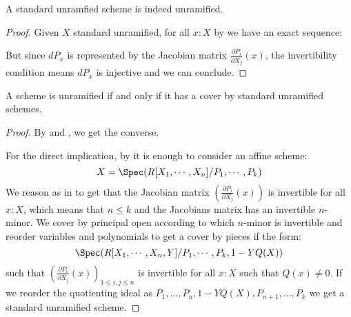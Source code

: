 
\begin{lemma}\label{standard-unramified-is-unramified}
A standard unramfied scheme is indeed unramified.
\end{lemma}

\begin{proof}
Given $X$ standard unramified, for all $x:X$ by  we have an exact sequence:
  \begin{center}
  \end{center}
  But since $dP_x$ is represented by the Jacobian matrix $\frac{\partial P_i}{\partial X_j}(x)$, the invertibility condition means $dP_x$ is injective and we can conclude.
\end{proof}

\begin{proposition}
  \label{unramified-iff-locally-std-unramified}
A scheme is unramified if and only if it has a cover by standard unramified schemes.
\end{proposition}

\begin{proof}
By  and , we get the converse.

  For the direct implication, by  it is enough to consider an affine scheme: 
  \[
  X=\Spec(R[X_1,\cdots,X_n]/P_1,\cdots,P_k)
  \]
 We reason as in  to get that the Jacobian matrix $\left(\frac{\partial P_i}{\partial X_j}(x)\right)$ is invertible for all $x:X$, which means that $n\leq k$ and the Jacobians matrix has an invertible $n$-minor. We cover by principal open according to which $n$-minor is invertible and reorder variables and polynomials to get a cover by pieces if the form:
 \[\Spec(R[X_1,\cdots,X_n,Y]/P_1,\cdots,P_k,1-YQ(X))\]
 such that $\left(\frac{\partial P_i}{\partial X_j}(x)\right)_{1\leq i,j\leq n}$ is invertible for all $x:X$ such that $Q(x)\not=0$. If we reorder the quotienting ideal as $P_1,\hdots,P_n,1-YQ(X),P_{n+1},\hdots,P_k$ we get a standard unramified scheme.
\end{proof}


